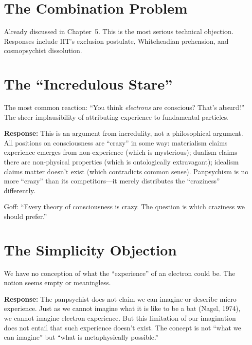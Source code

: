 \documentclass[11pt,a4paper]{report}
\begin{document}
\section{The Combination Problem}

Already discussed in Chapter~5. This is the most serious technical objection. Responses include IIT's exclusion postulate, Whiteheadian prehension, and cosmopsychist dissolution.

\section{The ``Incredulous Stare''}

\begin{objbox}
The most common reaction: ``You think \emph{electrons} are conscious? That's absurd!'' The sheer implausibility of attributing experience to fundamental particles.
\end{objbox}

\textbf{Response:} This is an argument from incredulity, not a philosophical argument. All positions on consciousness are ``crazy'' in some way: materialism claims experience emerges from non-experience (which is mysterious); dualism claims there are non-physical properties (which is ontologically extravagant); idealism claims matter doesn't exist (which contradicts common sense). Panpsychism is no more ``crazy'' than its competitors---it merely distributes the ``craziness'' differently.

Goff: ``Every theory of consciousness is crazy. The question is which craziness we should prefer.''

\section{The Simplicity Objection}

\begin{objbox}
We have no conception of what the ``experience'' of an electron could be. The notion seems empty or meaningless.
\end{objbox}

\textbf{Response:} The panpsychist does not claim we can imagine or describe micro-experience. Just as we cannot imagine what it is like to be a bat (Nagel, 1974), we cannot imagine electron experience. But this limitation of our imagination does not entail that such experience doesn't exist. The concept is not ``what we can imagine'' but ``what is metaphysically possible.''
\end{document}
